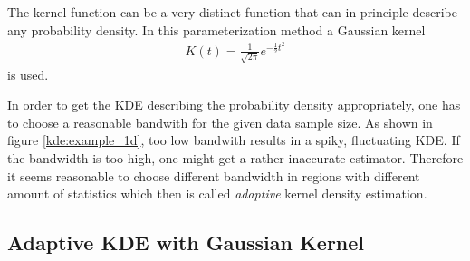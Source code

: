 The kernel function can be a very distinct function that can in principle describe any probability density. In this parameterization method a Gaussian kernel
\begin{align}
	K(t) = \frac{1}{\sqrt{2\pi}}e^{-\frac{1}{2}t^2}
\end{align}
is used.

In order to get the KDE describing the probability density appropriately, one has to choose a reasonable bandwith for the given data sample size. As shown in figure \ref{kde:example_1d}, too low bandwith results in a spiky, fluctuating KDE. If the bandwidth is too high, one might get a rather inaccurate estimator. Therefore it seems reasonable to choose different bandwidth in regions with different amount of statistics which then is called \textit{adaptive} kernel density estimation. \cite{kde:schoenen, kde:wangwang}

\subsection{Adaptive KDE with Gaussian Kernel}\label{sec:adaptive_kde}

